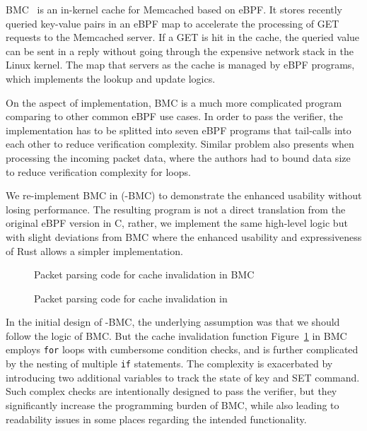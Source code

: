 BMC~\cite{BMC} is an in-kernel cache for Memcached based on eBPF.
It stores recently queried key-value pairs in an eBPF map to accelerate the
    processing of GET requests to the Memcached server.
If a GET is hit in the cache, the queried value can be sent in a reply without
    going through the expensive network stack in the Linux kernel.
The map that servers as the cache is managed by eBPF programs, which implements
    the lookup and update logics.

On the aspect of implementation, BMC is a much more complicated program
    comparing to other common eBPF use cases.
In order to pass the verifier, the implementation has to be splitted into seven
    eBPF programs that tail-calls into each other to reduce verification
    complexity.
Similar problem also presents when processing the incoming packet data, where
    the authors had to bound data size to reduce verification complexity for
    loops.

We re-implement BMC in \projname{} (\projname{}-BMC) to demonstrate the
    enhanced usability without losing performance.
The resulting program is not a direct translation from the original eBPF
    version in C, rather, we implement the same high-level logic but with
    slight deviations from BMC where the enhanced usability and expressiveness
    of Rust allows a simpler implementation.


\begin{figure}
    
    \caption{Packet parsing code for cache invalidation in BMC}
    \label{fig:bmc-code}
\end{figure}
\begin{figure}
    
    \caption{Packet parsing code for cache invalidation in \projname{}}
    \label{fig:rust-code}
\end{figure}

In the initial design of \projname{}-BMC, the underlying assumption was that
    we should follow the logic of BMC.
But the cache invalidation function Figure~\ref{fig:bmc-code} in BMC employs
    \texttt{for} loops with cumbersome condition checks, and is further
    complicated by the nesting of multiple \texttt{if} statements.
The complexity is exacerbated by introducing two additional variables to track
    the state of key and SET command.
Such complex checks are intentionally designed to pass the
    verifier, but they significantly increase the programming burden
    of BMC, while also leading to readability issues in some places regarding
    the intended functionality.

